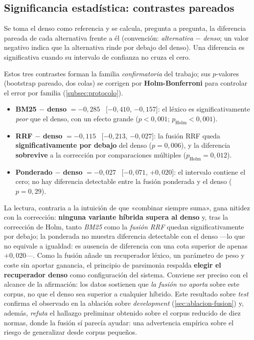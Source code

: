 \subsection{Significancia estadística: contrastes pareados}
\label{subsec:flagship-pareado}

Se toma el denso como referencia y se calcula, pregunta a pregunta, la diferencia pareada de cada alternativa frente a él (convención: \emph{alternativa} $-$ \emph{denso}; un valor negativo indica que la alternativa rinde por debajo del denso). Una diferencia es significativa cuando su intervalo de confianza no cruza el cero.

Estos tres contrastes forman la familia \emph{confirmatoria} del trabajo; sus $p$-valores (bootstrap pareado, dos colas) se corrigen por \textbf{Holm-Bonferroni} para controlar el error por familia (\ref{subsec:protocolo}).

\begin{itemize}
  \item \textbf{BM25 $-$ denso} $= -0{,}285$ \ [$-0{,}410$, $-0{,}157$]: el léxico es significativamente \emph{peor} que el denso, con un efecto grande ($p<0{,}001$; $p_{\text{Holm}}<0{,}001$).
  \item \textbf{RRF $-$ denso} $= -0{,}115$ \ [$-0{,}213$, $-0{,}027$]: la fusión RRF queda \textbf{significativamente por debajo} del denso ($p=0{,}006$), y la diferencia \textbf{sobrevive} a la corrección por comparaciones múltiples ($p_{\text{Holm}}=0{,}012$).
  \item \textbf{Ponderado $-$ denso} $= -0{,}027$ \ [$-0{,}071$, $+0{,}020$]: el intervalo contiene el cero; no hay diferencia detectable entre la fusión ponderada y el denso ($p=0{,}29$).
\end{itemize}

La lectura, contraria a la intuición de que «combinar siempre suma», gana nitidez con la corrección: \textbf{ninguna variante híbrida supera al denso} y, tras la corrección de Holm, tanto \emph{BM25} como la \emph{fusión RRF} quedan significativamente por debajo; la ponderada no muestra diferencia detectable con el denso —lo que no equivale a igualdad: es ausencia de diferencia con una cota superior de apenas $+0{,}020$—. Como la fusión añade un recuperador léxico, un parámetro de peso y coste sin aportar ganancia, el principio de parsimonia respalda \textbf{elegir el recuperador denso} como configuración del sistema. Conviene ser preciso con el alcance de la afirmación: los datos sostienen que \emph{la fusión no aporta} sobre este corpus, no que el denso sea superior a cualquier híbrido. Este resultado sobre \emph{test} confirma el observado en la ablación sobre \emph{development} (\ref{sec:ablacion-fusion}) y, además, \emph{refuta} el hallazgo preliminar obtenido sobre el corpus reducido de diez normas, donde la fusión sí parecía ayudar: una advertencia empírica sobre el riesgo de generalizar desde corpus pequeños.

